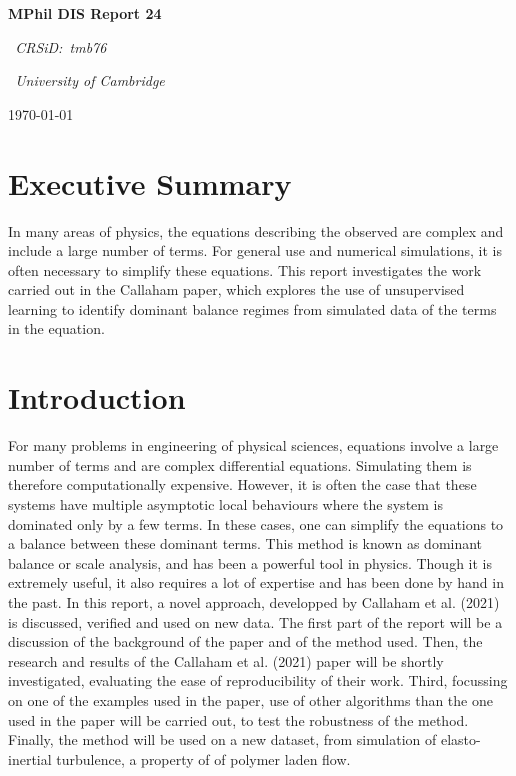 \documentclass[12pt]{report} %
\begin{document}
\begin{titlepage}
  \centering
  \vspace*{2cm}
  {\LARGE\bfseries MPhil DIS Report 24\par}
  \vspace{1cm}
  {\Large\itshape\ CRSiD:\ tmb76\par}
  \vspace{1cm}
  {\Large\itshape\ University of Cambridge\par}
  \vfill
  {\large\today\par}
\end{titlepage}

\tableofcontents

\chapter{Executive Summary}

In many areas of physics, the equations describing the observed are complex and include a large number of terms. For general use and numerical simulations, it is often necessary to simplify these equations. This report investigates the work carried out in the Callaham paper, which explores the use of unsupervised learning to identify dominant balance regimes from simulated data of the terms in the equation.

\chapter{Introduction}

For many problems in engineering of physical sciences, equations involve a large number of terms and are complex differential equations. Simulating them is therefore computationally expensive. However, it is often the case that these systems have multiple asymptotic local behaviours where the system is dominated only by a few terms. In these cases, one can simplify the equations to a balance between these dominant terms. This method is known as dominant balance or scale analysis, and has been a powerful tool in physics. Though it is extremely useful, it also requires a lot of expertise and has been done by hand in the past. In this report, a novel approach, developped by Callaham et al. (2021)\cite{callaham2021learning} is discussed, verified and used on new data. The first part of the report will be a discussion of the background of the paper and of the method used. Then, the research and results of the Callaham et al. (2021)\cite{callaham2021learning} paper will be shortly investigated, evaluating the ease of reproducibility of their work. Third, focussing on one of the examples used in the paper, use of other algorithms than the one used in the paper will be carried out, to test the robustness of the method. Finally, the method will be used on a new dataset, from simulation of elasto-inertial turbulence, a property of of polymer laden flow.
\end{document}
